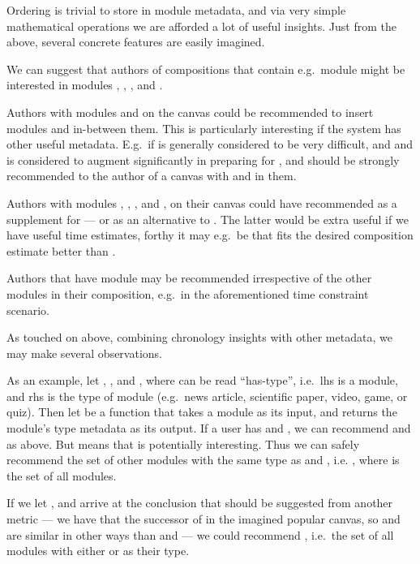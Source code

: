 \documentclass{article}
\begin{document}
\begin{multicols}{2}
Ordering is trivial to store in module metadata, and via very simple 
mathematical operations we are afforded a lot of useful insights. Just from 
the above, several concrete features are easily imagined.

\begin{itemize*}
  \item We can suggest that authors of compositions that contain e.g.\ module 
 might be interested in modules , , , and .
   \item Authors with modules  and  on the canvas could be recommended 
   to insert modules  and  in-between them. This is particularly 
   interesting if the system has other useful metadata. E.g.\ if  is 
   generally considered to be very difficult, and  and  is considered to 
   augment  significantly in preparing for ,  and  should be 
   strongly recommended to the author of a canvas with  and  in them.
   \item Authors with modules , , , and , on their canvas could 
   have  recommended as a supplement for  --- or as an alternative to 
   . The latter would be extra useful if we have useful time estimates, 
   forthy it may e.g.\ be that  fits the desired composition estimate 
   better than .
   \item Authors that have module  may be recommended  irrespective of 
   the other modules in their composition, e.g.\ in the aforementioned time 
   constraint  scenario.
\end{itemize*}

As touched on above, combining chronology insights with other metadata, we may 
make several observations.

As an example, let , , and , where  can be read 
``has-type'', i.e.\ lhs is a module, and rhs is the type of module (e.g.\ news 
article, scientific paper, video, game, or quiz). Then let  be a function 
that takes a module as its input, and returns the module's type metadata as 
its output. If a user has  and , we can recommend  and  as above. 
But  means that  is potentially interesting. Thus we can safely 
recommend the set of other modules with the same type as  and , i.e. 
, where  is the set of all 
modules.

If we let , and arrive at the conclusion that  should be suggested 
from another metric --- we have that the successor of  in the 
imagined popular canvas, so  and  are similar in other ways than  
and  --- we could recommend , i.e.\ the set of all modules with either  or  as 
their type.


\end{multicols}
\end{document}

